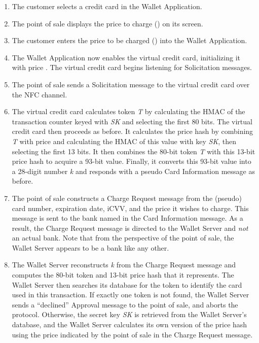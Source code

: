 \begin{enumerate}
\item The customer selects a credit card in the Wallet Application.

\item The point of sale displays the price to charge () on its screen.

\item The customer enters the price to be charged () into the Wallet Application.

\item The Wallet Application now enables the virtual credit card, initializing it with price .
    The virtual credit card begins listening for Solicitation messages.

\item The point of sale sends a Solicitation message to the virtual credit card over the NFC channel.

\item
    The virtual credit card calculates token \emph{T} by calculating the HMAC of the transaction counter keyed with \emph{SK} and selecting the first 80 bits.
    The virtual credit card then proceeds as before.
    It calculates the price hash by combining \emph{T} with price  and calculating the HMAC of this value with key \emph{SK}, then selecting the first 13 bits.
    It then combines the 80-bit token \emph{T} with this 13-bit price hash to acquire a 93-bit value.
    Finally, it converts this 93-bit value into a 28-digit number \emph{k} and responds with a pseudo Card Information message as before.

\item The point of sale constructs a Charge Request message from the (pseudo) card number, expiration date, iCVV, and the price it wishes to charge.
    This message is sent to the bank named in the Card Information message.
    As a result, the Charge Request message is directed to the Wallet Server and \emph{not} an actual bank.
    Note that from the perspective of the point of sale, the Wallet Server appears to be a bank like any other.

\item The Wallet Server reconstructs \emph{k} from the Charge Request message and computes the 80-bit token and 13-bit price hash that it represents.
    The Wallet Server then searches its database for the token to identify the card used in this transaction.
    If exactly one token is not found, the Wallet Server sends a ``declined'' Approval message to the point of sale, and aborts the protocol.
    Otherwise, the secret key \emph{SK} is retrieved from the Wallet Server's database, and the Wallet Server calculates its own version of the price hash
        using the price indicated by the point of sale in the Charge Request message.


\end{enumerate}
